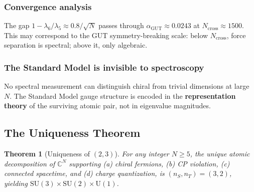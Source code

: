\documentclass[12pt]{article}
\newtheorem{theorem}{Theorem}[section]
\theoremstyle{remark}
\theoremstyle{definition}
\newcommand{\CC}{\mathbb{C}}
\newcommand{\agut}{\alpha_{\mathrm{GUT}}}
\begin{document}
\subsubsection{Convergence analysis}

The gap $1 - \lambda_6/\lambda_5 \approx 0.8/\sqrt{N}$ passes through $\agut \approx 0.0243$ at $N_\text{cross} \approx 1500$. This may correspond to the GUT symmetry-breaking scale: below $N_\text{cross}$, force separation is spectral; above it, only algebraic.

\subsubsection{The Standard Model is invisible to spectroscopy}

No spectral measurement can distinguish chiral from trivial dimensions at large $N$. The Standard Model gauge structure is encoded in the \textbf{representation theory} of the surviving atomic pair, not in eigenvalue magnitudes.

\subsection{The Uniqueness Theorem}

\begin{theorem}[Uniqueness of $(2,3)$]
For any integer $N \geq 5$, the unique atomic decomposition of $\CC^N$ supporting (a) chiral fermions, (b) CP violation, (c) connected spacetime, and (d) charge quantization, is $(n_S, n_T) = (3, 2)$, yielding $\text{SU}(3)\times\text{SU}(2)\times\text{U}(1)$.
\end{theorem}
\end{document}
